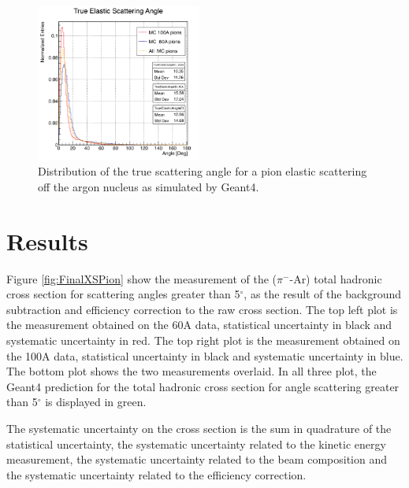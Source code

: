 \begin{figure}[p]
\centering
\includegraphics[width=0.48\textwidth]{Chapter-5/Images//cAngleTrue.png}
\caption{Distribution of the true scattering angle for a pion elastic scattering off the argon nucleus as simulated by Geant4.}
\label{fig:trueScatteringAngle}
\end{figure}




\clearpage
\section{Results}\label{ch:FinalPion}
Figure \ref{fig:FinalXSPion} show the measurement of the ($\pi^-$-Ar) total hadronic cross section for  scattering angles greater than 5$^\circ$, as the result of the background subtraction and efficiency correction to the raw cross section. The top left plot is the measurement obtained on the 60A data, statistical uncertainty in black and systematic uncertainty in red. The top right plot is the measurement obtained on the 100A data, statistical uncertainty in black and systematic uncertainty in blue. The bottom plot shows the two measurements overlaid. In all three plot, the Geant4 prediction for the total hadronic cross section for angle scattering greater than 5$^\circ$ is displayed in green.

The systematic uncertainty on the cross section is the sum in quadrature of the statistical uncertainty, the systematic uncertainty related to the kinetic energy measurement, the systematic uncertainty related to the beam composition and the systematic uncertainty related to the efficiency correction.

